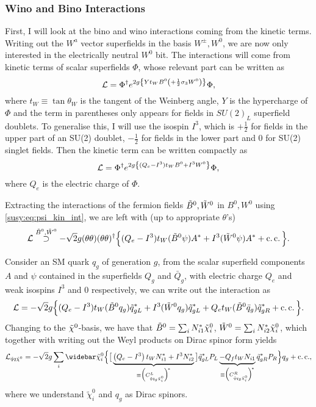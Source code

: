 \documentclass[../main.tex]{subfiles}
\begin{document}
\subsubsection*{Wino and Bino Interactions}
First, I will look at the bino and wino interactions coming from the kinetic terms.
Writing out the \(W^a\) vector superfields in the basis \(W^\pm, W^0\), we are now only interested in the electrically neutral \(W^0\) bit.
The interactions will come from kinetic terms of scalar superfields \(\Phi\), whose relevant part can be written as
\begin{equation}
  \L = \Phi^\dagger \exp{2g\cclosed{Y t_W B^0 \pclosed{+ \frac{1}{2}\sigma_3 W^0}}} \Phi,
\end{equation}
where \(t_W \equiv \tan\theta_W\) is the tangent of the Weinberg angle, \(Y\) is the hypercharge of \(\Phi\) and the term in parentheses only appears for fields in \(SU(2)_L\) superfield doublets.
To generalise this, I will use the isospin \(I^3\), which is \(+\frac{1}{2}\) for fields in the upper part of an SU(2) doublet, \(-\frac{1}{2}\) for fields in the lower part and 0 for SU(2) singlet fields.
Then the kinetic term can be written compactly as
\begin{equation}
  \L = \Phi^\dagger \exp{2g\cclosed{(Q_e - I^3) t_W B^0 + I^3 W^0}} \Phi,
\end{equation}
where \(Q_e\) is the electric charge of \(\Phi\).
\medskip

Extracting the interactions of the fermion fields \(\bino, \wino\) in \(B^0,
W^0\) using \cref{susy:eq:psi_kin_int}, we are left with (up to appropriate
\(\theta\)'s)
\begin{equation}
  \L \stackrel{\bino, \wino}{\supset} -\sqrt{2}g (\theta\theta)(\theta\theta)^\dagger \Big\{ (Q_e - I^3)t_W (\bino \psi) A^\ast + I^3 (\wino \psi) A^\ast + \cc \Big\}.
\end{equation}

Consider an SM quark \(q_g\) of generation \(g\), from the scalar superfield components \(A\) and \(\psi\) contained in the superfields \(Q_g\) and \(\bar{Q}_g\), with
electric charge \(Q_e\) and weak isospins \(I^3\) and 0 respectively, we can write out the interaction as
\begin{equation}
  \L = -\sqrt{2}g \Big\{ (Q_e - I^3)t_W (\bino q_g) \tilde{q}_{gL}^\ast + I^3 (\wino q_g) \tilde{q}_{gL}^\ast + Q_e t_W (\bino \bar{q}_g) \tilde{q}_{gR}^\ast + \cc \Big\}.
\end{equation}
Changing to the \(\nino\)-basis, we have that \(\bino = \sum_i N_{i1}^\ast \nino[i]\), \(\wino = \sum_i N_{i2}^\ast \nino[i]\), which together with writing out the Weyl products on Dirac spinor form yields
\begin{equation}
  \label{susy:eq:nino_sf_f_int}
  \L_{\tilde{q}q\tilde{\chi}^0} = -\sqrt{2} g \sum_{i} \barnino[i] \Big\{ \big[ \underbrace{\pclosed{Q_e - I^3}t_W N_{i1}^\ast  + I^3 N_{i2}^\ast}_{\equiv \Big(C_{\tilde{q} q_g \tilde{\chi}_i^0}^{L}\Big)^{\!\ast}} \big] \tilde{q}_{gL}^\ast P_L \underbrace{- Q_f t_W N_{i1}}_{\equiv \Big(C_{\tilde{q} q_g \tilde{\chi}_i^0}^{R}\Big)^{\!\ast}} \tilde{q}_{gR}^\ast P_R \Big\} q_g + \cc,
\end{equation}
where we understand \(\tilde\chi^0_i\) and \(q_g\) as Dirac spinors.
\end{document}
